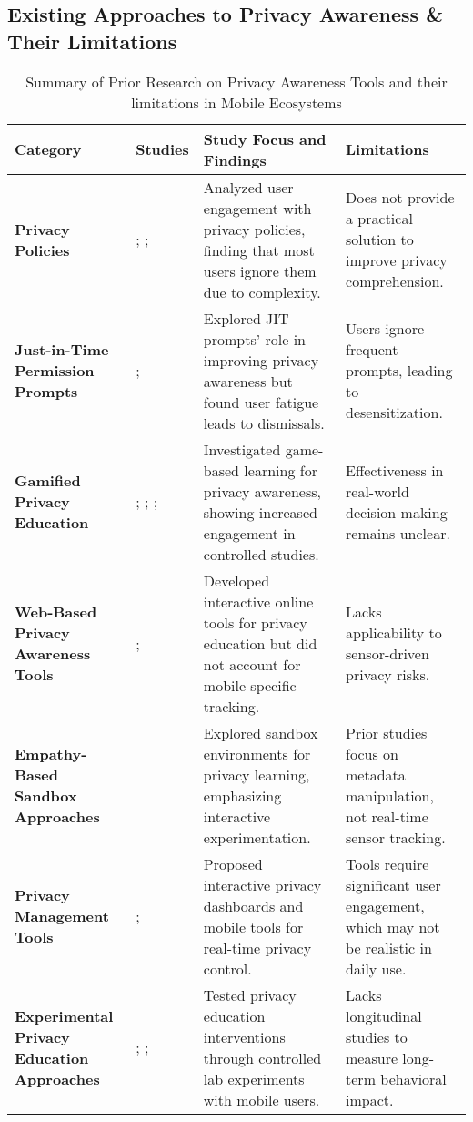 \documentclass[acmlarge, nonacm]{acmart}
\begin{document}
\subsection{Existing Approaches to Privacy Awareness \& Their Limitations}

\begin{table*}[ht]
\centering
\begin{tabular}{|p{3cm}|p{2cm}|p{5cm}|p{4cm}|}
\hline
\textbf{Category} & \textbf{Studies} & \textbf{Study Focus and Findings} & \textbf{Limitations} \\ 
\hline
\textbf{Privacy Policies} & \citet{Obar2018The}; \citet{Korunovska2020TheCA}; \citet{stellmacher2022escaping} & Analyzed user engagement with privacy policies, finding that most users ignore them due to complexity. & Does not provide a practical solution to improve privacy comprehension. \\
\hline
\textbf{Just-in-Time Permission Prompts} & \citet{Park2023Understanding}; \citet{Gruber2022Towards} & Explored JIT prompts' role in improving privacy awareness but found user fatigue leads to dismissals. & Users ignore frequent prompts, leading to desensitization. \\
\hline
\textbf{Gamified Privacy Education} & \citet{Pahlavanpour2024gamified}; \cite{QUAYYUM2025100826}; \citet{dincelli2020choose}; \citet{stellmacher2022escaping} & Investigated game-based learning for privacy awareness, showing increased engagement in controlled studies. & Effectiveness in real-world decision-making remains unclear. \\
\hline
\textbf{Web-Based Privacy Awareness Tools} & \citet{Hasrama2024Exploring}; \citet{bian2021supply} & Developed interactive online tools for privacy education but did not account for mobile-specific tracking. & Lacks applicability to sensor-driven privacy risks. \\
\hline
\textbf{Empathy-Based Sandbox Approaches} & \citet{Chaoran2023EmpathySandbox} & Explored sandbox environments for privacy learning, emphasizing interactive experimentation. & Prior studies focus on metadata manipulation, not real-time sensor tracking. \\
\hline
\textbf{Privacy Management Tools} & \citet{al-muhander2023}; \citet{Stephanidis04022025} & Proposed interactive privacy dashboards and mobile tools for real-time privacy control. & Tools require significant user engagement, which may not be realistic in daily use. \\
\hline
\textbf{Experimental Privacy Education Approaches} & \citet{Fleischhauer2022Paradox}; \citet{aly2024tailoring}; \citet{botturi2023school} & Tested privacy education interventions through controlled lab experiments with mobile users. & Lacks longitudinal studies to measure long-term behavioral impact. \\
\hline
\end{tabular}
\caption{Summary of Prior Research on Privacy Awareness Tools and their limitations in Mobile Ecosystems}
\label{tab:privacy_awareness}
\end{table*}
\end{document}
